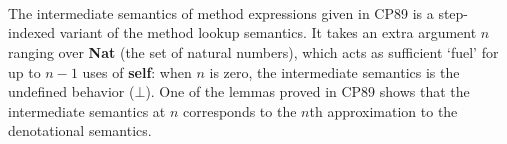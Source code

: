 \begin{AgdaAlign}
\begin{code}
\AgdaSymbol{(}\AgdaSpace{}%
\AgdaSpace{}%
\AgdaSymbol{)}\AgdaSpace{}%
\AgdaSymbol{(}\AgdaSpace{}%
\AgdaSpace{}%
\AgdaSymbol{)}\AgdaSpace{}%
\AgdaSymbol{(}\AgdaSpace{}%
\AgdaSpace{}%
\AgdaSymbol{)}\<%
\\
%
\>[4]\AgdaSymbol{(}\AgdaSpace{}%
\AgdaSpace{}%
\AgdaSymbol{)}\AgdaSpace{}%
\AgdaSymbol{(}\AgdaSpace{}%
\AgdaSpace{}%
\AgdaSymbol{)}\AgdaSpace{}%
\AgdaSymbol{(}\AgdaSpace{}%
\AgdaSpace{}%
\AgdaSymbol{)}\AgdaSpace{}%
\AgdaSymbol{(}\AgdaSpace{}%
\AgdaSpace{}%
\AgdaSymbol{)}\<%
\\
%
\>[4]\AgdaSymbol{\{\{}\AgdaSpace{}%
\AgdaSpace{}%
\AgdaSymbol{\}\}}\AgdaSpace{}%
\AgdaSymbol{\{\{}\AgdaSpace{}%
\AgdaSpace{}%
\AgdaSymbol{\}\}}\AgdaSpace{}%
\AgdaSymbol{\{\{}\AgdaSpace{}%
\AgdaSpace{}%
\AgdaSymbol{\}\}}\AgdaSpace{}%
\AgdaSymbol{(}\AgdaSpace{}%
\AgdaSpace{}%
\AgdaSymbol{)}\<%
\\
%
\\[\AgdaEmptyExtraSkip]%
\>[0]\AgdaSpace{}%
\AgdaModule{\AgdaUnderscore{}}\<%
\\
\>[0][@{}l@{\AgdaIndent{0}}]%
\>[4]\AgdaSymbol{(}\AgdaSpace{}%
%
\>[16]\AgdaSymbol{:}\AgdaSpace{}%
\AgdaSpace{}%
\AgdaSpace{}%
\AgdaSpace{}%
\AgdaSymbol{)}\<%
\\
%
\>[4]\AgdaSymbol{(}\AgdaSpace{}%
%
\>[16]\AgdaSymbol{:}\AgdaSpace{}%
\AgdaSpace{}%
\AgdaSpace{}%
\AgdaSpace{}%
\AgdaSpace{}%
\AgdaSymbol{(}\AgdaSpace{}%
\AgdaSymbol{)}\AgdaSpace{}%
\AgdaSymbol{)}\<%
\\
\>[0][@{}l@{\AgdaIndent{0}}]%
\>[2]\<%
\\
%
\>[2]\AgdaSpace{}%
\AgdaSpace{}%
\AgdaSymbol{(}\AgdaSpace{}%
\AgdaSpace{}%
\AgdaSymbol{)}\AgdaSpace{}%
\AgdaSymbol{(}\AgdaSpace{}%
\AgdaSpace{}%
\AgdaSymbol{)}\<%
\end{code}
%
The intermediate semantics of method expressions given in CP89
is a step-indexed variant of the method lookup semantics.
It takes an extra argument $n$ ranging over \textbf{Nat} (the set of natural numbers),
which acts as sufficient `fuel' for up to $n-1$ uses of \textbf{self}:
when $n$ is zero, the intermediate semantics is the undefined behavior ($\bot$).
One of the lemmas proved in CP89 shows that the intermediate semantics at $n$
corresponds to the $n$th approximation to the denotational semantics.


\end{AgdaAlign}
